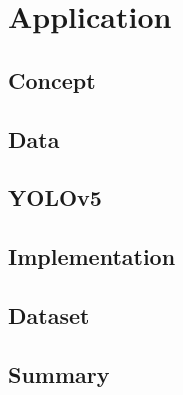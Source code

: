 \chapter{Application}\label{chpt:application}
\glsresetall

\section{Concept}\label{sec:app:concept}

\section{Data}\label{sec:app:data}

\section{YOLOv5}\label{sec:app:yolov5}

\section{Implementation}\label{sec:app:impl}

\section{Dataset}\label{sec:app:dataset}

\section{Summary}\label{sec:app:summary}
